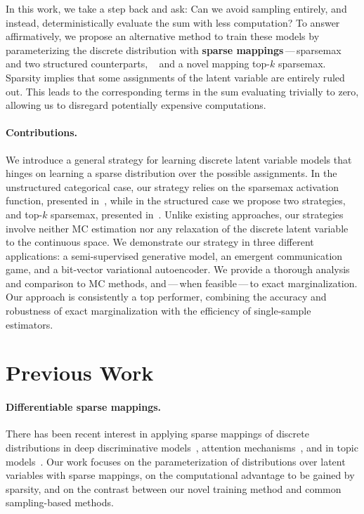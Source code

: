 In this work, we take a step back and ask: Can we avoid sampling
entirely, and instead, deterministically evaluate the sum with less
computation? To answer affirmatively, we propose an alternative
method to train these models by parameterizing the discrete
distribution with {\bf sparse
        mappings}\,---\,sparsemax~\citep{sparsemax} and two
structured counterparts, \smap~\citep{sparsemap} and a
novel mapping top-$k$ sparsemax. Sparsity implies that some
assignments of the latent variable are entirely ruled out. This leads
to the corresponding terms in the sum evaluating trivially to zero,
allowing us to disregard potentially expensive computations.

\paragraph*{Contributions.} We introduce a general strategy for
learning discrete latent variable models that hinges on
learning a sparse distribution over the possible assignments. In the
unstructured categorical case, our strategy relies on the sparsemax
activation function, presented in~, while in the
structured case we propose two strategies, \smap and top-$k$
sparsemax, presented in~. Unlike existing
approaches, our strategies involve neither MC estimation nor any
relaxation of the discrete latent variable to the continuous space.
We demonstrate our strategy in three different applications: a
semi-supervised generative model, an emergent communication game, and
a bit-vector variational autoencoder. We provide a thorough analysis
and comparison to MC methods, and\,---\,when feasible\,---\,to exact
marginalization. Our approach is consistently a top performer,
combining the accuracy and robustness of exact marginalization with
the efficiency of single-sample estimators.

\section{Previous Work}

\paragraph*{Differentiable sparse mappings.} There has been recent
interest in applying sparse mappings of discrete distributions in
deep discriminative models~\citep{sparsemax,
    sparsemap, fusedmax, entmax, sparsemapcg}, attention
mechanisms~\citep{malaviya2018sparse, shao2019ssn,
    maruf2019selective, correia2019adaptively}, and in topic
models~\citep{caothesis}. Our work focuses on the parameterization of
distributions over latent variables with sparse mappings, on the
computational advantage to be gained by sparsity, and on the contrast
between our novel training method and common sampling-based methods.

